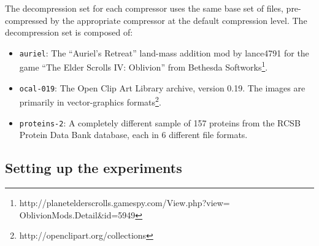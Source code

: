 The decompression set for each compressor uses the same base set of files, pre-compressed by the appropriate compressor at the default compression level.  The decompression set is composed of:
\begin{itemize}
\item {\tt auriel}: The ``Auriel's Retreat'' land-mass addition mod by lance4791 for the game ``The Elder Scrolls IV: Oblivion'' from Bethesda Softworks\footnote{http://planetelderscrolls.gamespy.com/View.php?view=\\ \hspace*{150 pt}OblivionMods.Detail\&id=5949}.




\item {\tt ocal-019}: The Open Clip Art Library archive, version 0.19. The images are primarily in vector-graphics formats\footnote{http://openclipart.org/collections}.


\item {\tt proteins-2}: A completely different sample of 157 proteins from the RCSB Protein Data Bank database, each in 6 different file formats.


\end{itemize}

\subsection{Setting up the experiments}

